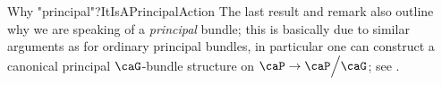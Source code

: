 \documentclass[reqno,a4paper,oneside]{amsart}
\theoremstyle{plain}
\theoremstyle{remark}
\theoremstyle{definition}
\def\bas#1\eas{\begin{align*}#1\end{align*}}
\begin{document}
\begin{remarks}{Why "principal"?}{ItIsAPrincipalAction}
The last result and remark also outline why we are speaking of a \textit{principal} bundle; this is basically due to similar arguments as for ordinary principal bundles, in particular one can construct a canonical principal $\caG$-bundle structure on $\caP \to \caP\Big/\caG$; see \cite[\S 5.7, Lemma 5.35, page 146.]{GroupoidBasedPrincipalBundles}.
%
%
\end{remarks}
\end{document}
